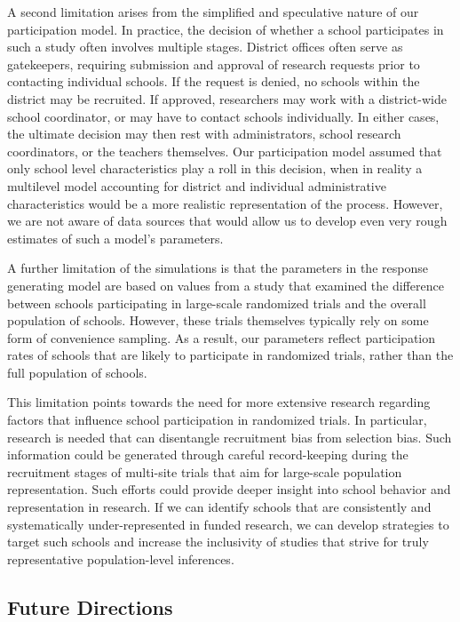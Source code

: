 \documentclass[
  man,floatsintext]{apa6}
\begin{document}
A second limitation arises from the simplified and speculative nature of our participation model. In practice, the decision of whether a school participates in such a study often involves multiple stages. District offices often serve as gatekeepers, requiring submission and approval of research requests prior to contacting individual schools. If the request is denied, no schools within the district may be recruited. If approved, researchers may work with a district-wide school coordinator, or may have to contact schools individually. In either cases, the ultimate decision may then rest with administrators, school research coordinators, or the teachers themselves. Our participation model assumed that only school level characteristics play a roll in this decision, when in reality a multilevel model accounting for district and individual administrative characteristics would be a more realistic representation of the process. However, we are not aware of data sources that would allow us to develop even very rough estimates of such a model's parameters.

A further limitation of the simulations is that the parameters in the response generating model are based on values from a study that examined the difference between schools participating in large-scale randomized trials and the overall population of schools. However, these trials themselves typically rely on some form of convenience sampling. As a result, our parameters reflect participation rates of schools that are likely to participate in randomized trials, rather than the full population of schools.

This limitation points towards the need for more extensive research regarding factors that influence school participation in randomized trials. In particular, research is needed that can disentangle recruitment bias from selection bias. Such information could be generated through careful record-keeping during the recruitment stages of multi-site trials that aim for large-scale population representation.
Such efforts could provide deeper insight into school behavior and representation in research. If we can identify schools that are consistently and systematically under-represented in funded research, we can develop strategies to target such schools and increase the inclusivity of studies that strive for truly representative population-level inferences.

\hypertarget{future-directions}{%
\subsection*{Future Directions}\label{future-directions}}
\end{document}

